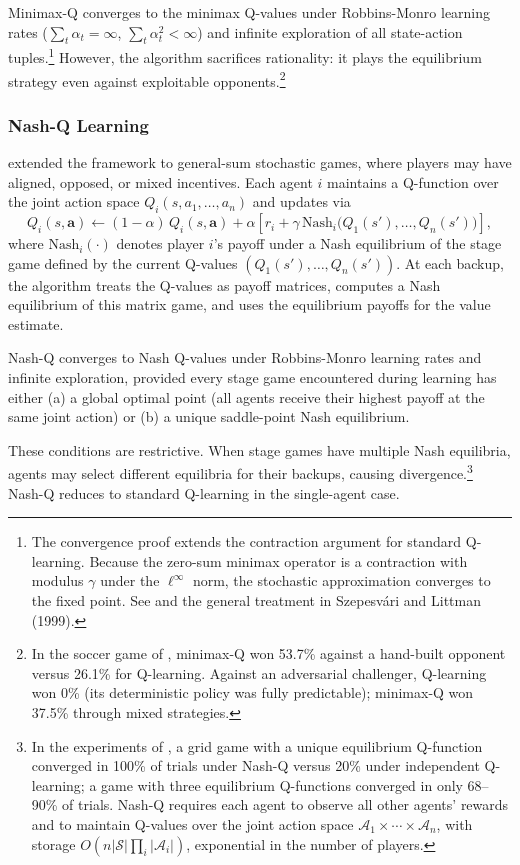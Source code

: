 Minimax-Q converges to the minimax Q-values under Robbins-Monro learning rates ($\sum_t \alpha_t = \infty$, $\sum_t \alpha_t^2 < \infty$) and infinite exploration of all state-action tuples.\footnote{The convergence proof extends the contraction argument for standard Q-learning. Because the zero-sum minimax operator is a contraction with modulus $\gamma$ under the $\ell^\infty$ norm, the stochastic approximation converges to the fixed point. See \citet{littman1994markov} and the general treatment in Szepesvári and Littman (1999).} However, the algorithm sacrifices rationality: it plays the equilibrium strategy even against exploitable opponents.\footnote{In the soccer game of \citet{littman1994markov}, minimax-Q won 53.7\% against a hand-built opponent versus 26.1\% for Q-learning. Against an adversarial challenger, Q-learning won 0\% (its deterministic policy was fully predictable); minimax-Q won 37.5\% through mixed strategies.}

\subsubsection{Nash-Q Learning}

\citet{hu2003nash} extended the framework to general-sum stochastic games, where players may have aligned, opposed, or mixed incentives. Each agent $i$ maintains a Q-function over the joint action space $Q_i(s, a_1, \ldots, a_n)$ and updates via
\begin{equation}
Q_i(s, \mathbf{a}) \leftarrow (1-\alpha)\, Q_i(s, \mathbf{a}) + \alpha\left[r_i + \gamma\, \text{Nash}_i\bigl(Q_1(s'), \ldots, Q_n(s')\bigr)\right],
\end{equation}
where $\text{Nash}_i(\cdot)$ denotes player $i$'s payoff under a Nash equilibrium of the stage game defined by the current Q-values $(Q_1(s'), \ldots, Q_n(s'))$. At each backup, the algorithm treats the Q-values as payoff matrices, computes a Nash equilibrium of this matrix game, and uses the equilibrium payoffs for the value estimate.

\begin{theorem}
Nash-Q converges to Nash Q-values under Robbins-Monro learning rates and infinite exploration, provided every stage game encountered during learning has either (a) a global optimal point (all agents receive their highest payoff at the same joint action) or (b) a unique saddle-point Nash equilibrium.
\end{theorem}

These conditions are restrictive. When stage games have multiple Nash equilibria, agents may select different equilibria for their backups, causing divergence.\footnote{In the experiments of \citet{hu2003nash}, a grid game with a unique equilibrium Q-function converged in 100\% of trials under Nash-Q versus 20\% under independent Q-learning; a game with three equilibrium Q-functions converged in only 68--90\% of trials. Nash-Q requires each agent to observe all other agents' rewards and to maintain Q-values over the joint action space $\mathcal{A}_1 \times \cdots \times \mathcal{A}_n$, with storage $O(n |\mathcal{S}| \prod_i |\mathcal{A}_i|)$, exponential in the number of players.} Nash-Q reduces to standard Q-learning in the single-agent case.

